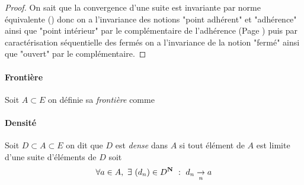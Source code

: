 		
		\begin{proof}
		On sait que la convergence d'une suite est invariante par norme équivalente () 
		donc on a l'invariance des notions "point adhérent" et "adhérence" ainsi que "point intérieur" par le complémentaire de l'adhérence (Page \pageref{2.1.5}) puis par 
		caractérisation séquentielle des fermés on a l'invariance de la notion "fermé" ainsi que "ouvert" par le complémentaire.
		\end{proof}
		
		
		\traitd
		\paragraph{Frontière}
		Soit $A\subset E$ on définie sa \emph{frontière} comme  
		\trait
		
		
		\traitd
		\paragraph{Densité}
			Soit $D\subset A\subset E$ on dit que $D$ est \emph{dense} dans $A$ si tout élément de $A$ est limite d'une suite d'éléments de $D$ soit 
			\[
				\forall a\in A ,~\exists ~\suite{d} \in D^{\mathbf{N}} ~:~d_n\underset{n}{\to} a
			\vspace{-20pt}
			\] 
		\trait
		
		
